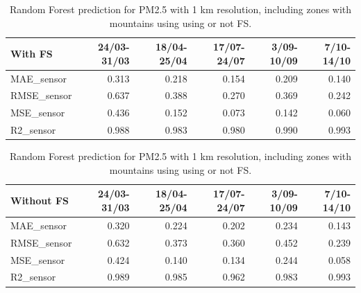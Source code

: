 \begin{table}[H]
\begin{tabular}{lrrrrr}
\toprule
With FS &  24/03-31/03 &  18/04-25/04 &  17/07-24/07 &  3/09-10/09 &  7/10-14/10 \\
\midrule
 MAE\_sensor &        0.313 &        0.218 &        0.154 &       0.209 &       0.140 \\
RMSE\_sensor &        0.637 &        0.388 &        0.270 &       0.369 &       0.242 \\
 MSE\_sensor &        0.436 &        0.152 &        0.073 &       0.142 &       0.060 \\
  R2\_sensor &        0.988 &        0.983 &        0.980 &       0.990 &       0.993 \\
\bottomrule
\end{tabular}
\begin{tabular}{lrrrrr}
\toprule
Without FS &  24/03-31/03 &  18/04-25/04 &  17/07-24/07 &  3/09-10/09 &  7/10-14/10 \\
\midrule
 MAE\_sensor &        0.320 &        0.224 &        0.202 &       0.234 &       0.143 \\
RMSE\_sensor &        0.632 &        0.373 &        0.360 &       0.452 &       0.239 \\
 MSE\_sensor &        0.424 &        0.140 &        0.134 &       0.244 &       0.058 \\
  R2\_sensor &        0.989 &        0.985 &        0.962 &       0.983 &       0.993 \\
\bottomrule
\end{tabular}
\caption{Random Forest prediction for PM2.5 with 1 km resolution, including zones with mountains using using or not FS.}
\label{fig:importance1km}

\end{table}

